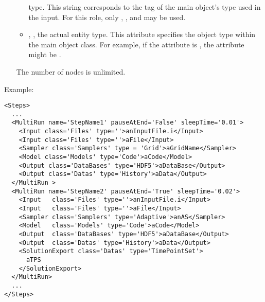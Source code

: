 \begin{itemize}
\begin{itemize}
    type.
    This string corresponds to the tag of the main object's type used in the
    input.
    For this role, only , , and 
     may be used.
  \item {}, , the actual entity
    type.
    This attribute specifies the object type within the main object class.
    For example, if the  attribute is , the
     attribute might be .
\end{itemize}
\nb The number of  nodes is unlimited.
\end{itemize}

Example:
\begin{lstlisting}[style=XML,morekeywords={pauseAtEnd,sleepTime,class}]
<Steps>
  ...
  <MultiRun name='StepName1' pauseAtEnd='False' sleepTime='0.01'>
    <Input class='Files' type=''>anInputFile.i</Input>
    <Input class='Files' type=''>aFile</Input>
    <Sampler class='Samplers' type = 'Grid'>aGridName</Sampler>
    <Model class='Models' type='Code'>aCode</Model>
    <Output class='DataBases' type='HDF5'>aDataBase</Output>
    <Output class='Datas' type='History'>aData</Output>
  </MultiRun >
  <MultiRun name='StepName2' pauseAtEnd='True' sleepTime='0.02'>
    <Input   class='Files' type=''>anInputFile.i</Input>
    <Input   class='Files' type=''>aFile</Input>
    <Sampler class='Samplers' type='Adaptive'>anAS</Sampler>
    <Model   class='Models' type='Code'>aCode</Model>
    <Output  class='DataBases' type='HDF5'>aDataBase</Output>
    <Output  class='Datas' type='History'>aData</Output>
    <SolutionExport class='Datas' type='TimePointSet'>
      aTPS
    </SolutionExport>
  </MultiRun>
  ...
</Steps>
\end{lstlisting}

